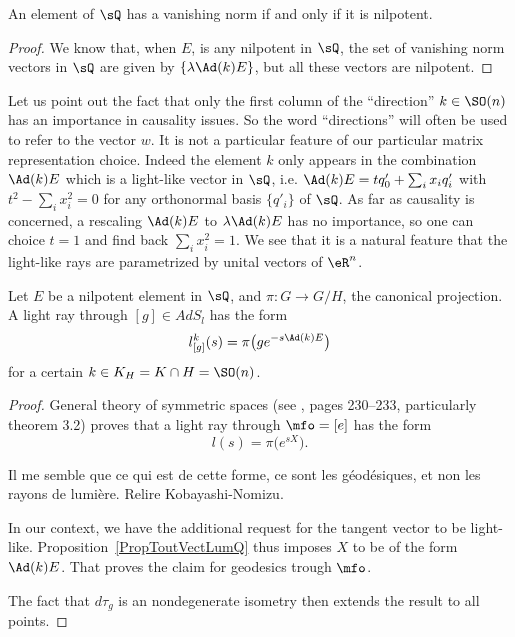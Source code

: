 \begin{corollary}		\label{CorNormZeroEQnil}
An element of $\sQ$ has a vanishing norm if and only if it is nilpotent.
\end{corollary}

\begin{proof}
We know that, when $E$, is any nilpotent in $\sQ$, the set of vanishing norm vectors in $\sQ$ are given by $\{ \lambda\Ad(k)E \}$, but all these vectors are nilpotent.
\end{proof}

Let us point out the fact that only the first column of the ``direction''{} $k\in \SO(n)$ has an importance in causality issues. So the word ``directions''{} will often be used to refer to the vector $w$. It is not a particular feature of our particular matrix representation choice. Indeed the element $k$ only appears in the combination $\Ad(k)E$ which is a light-like vector in $\sQ$, i.e. $\Ad(k)E=tq'_0+\sum_i x_iq'_i$ with $t^2-\sum_i x_i^2=0$ for any orthonormal basis $\{q'_i\}$ of $\sQ$. As far as causality is concerned, a rescaling $\Ad(k)E$ to $\lambda\Ad(k)E$ has no importance, so one can choice $t=1$ and find back $\sum_i x_i^2=1$. We see that it is a natural feature that the light-like rays are parametrized by  unital vectors of $\eR^n$.

\begin{lemma}		\label{LemGeodGenreLumiere}
Let $E$ be a nilpotent element in $\sQ$, and $\pi: G \rightarrow G/H$, the canonical projection. A light ray through $[g]\in AdS_l$ has the form
\begin{equation}
   l^k_{[g]}(s)=\pi\big( ge^{-s\Ad(k)E} \big)
\end{equation}
for a certain $k\in K_H=K\cap H=\SO(n)$.
 \label{lem:AdkEcone}
\end{lemma}

\begin{proof}
General theory of symmetric spaces (see \cite{kobayashi2}, pages 230--233, particularly theorem 3.2) proves that a light ray through $\mfo=[e]$ has the form
\[
  l(s)=\pi\big( e^{sX} \big).
\]

\begin{probleme}
	Il me semble que ce qui est de cette forme, ce sont les géodésiques, et non les rayons de lumière. Relire Kobayashi-Nomizu.
\end{probleme}


In our context, we have the additional request for the tangent vector to be light-like. Proposition~\ref{PropToutVectLumQ} thus imposes $X$ to be of the form $\Ad(k)E$. That proves the claim for geodesics trough $\mfo$.

The fact that $d\tau_g$ is an nondegenerate isometry then extends the result to all points.

\end{proof}

